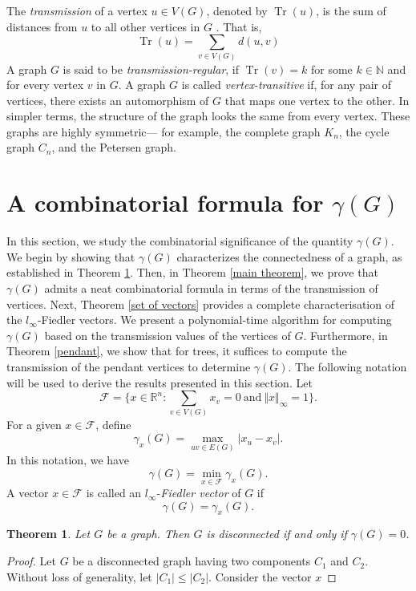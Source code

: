 \documentclass[12pt]{article}
\newtheorem{theorem}{Theorem}[section]
\DeclareMathOperator{\tr}{Tr}
\begin{document}
{{			The \textit{transmission} of a vertex $u \in V(G)$, denoted by  $\tr(u)$, is the sum of distances from $u$ to all other vertices in $G$ \cite{Distance-spectra}. That is, 
			$$
			\tr(u)=\sum_{ v\in V(G)}d(u,v)
			$$
			A graph $G$ is said to be \textit{transmission-regular}, if $\tr(v)=k$  for some $k\in \mathbb{N}$ and for every vertex $v$ in $G$.
			A graph $G$ is called \textit{vertex-transitive} \cite{nica-book-2018} if, for any pair of vertices, there exists an automorphism of $G$ that maps one vertex to the other. In simpler terms, the structure of the graph looks the same from every vertex. These graphs are highly symmetric--- for example, the complete graph $K_n$, the cycle graph $C_n$, and the Petersen graph. 
			
			\section{A combinatorial formula for $\gamma (G)$}\label{main-results}
			In this section, we study the combinatorial significance of the quantity $\gamma(G)$. We begin by showing that $\gamma(G)$ characterizes the connectedness of a graph, as established in Theorem \ref{gamma-connected}.
			Then, in Theorem \ref{main theorem}, we prove that $\gamma(G)$ admits a neat combinatorial formula in terms of the transmission of vertices. Next, Theorem \ref{set of vectors} provides a complete characterisation of the $l_\infty$-Fiedler vectors.  We present a polynomial-time algorithm for computing $\gamma(G)$ based on the transmission values of the vertices of $G$. Furthermore, in Theorem \ref{pendant}, we show that for trees, it suffices to compute the transmission of the pendant vertices to determine $\gamma(G)$.
			The following notation will be used to derive the results presented in this section. Let $$\mathcal{F}=\biggl\{x \in \mathbb{R}^n:\sum_{v \in V(G)} x_v =0 ~\mbox{and} ~\Vert x \Vert_{\infty}=1\biggl\}.$$
			For a given $x \in \mathcal{F}$, define $$ \gamma_x(G)=\max_{uv \in E(G)}\vert x_u - x_v \vert .$$ In this notation, we have $$\gamma(G)=\min_{x \in \mathcal{F}}\gamma_x(G). $$ A vector  $x \in \mathcal{F}$ is called an $l_\infty$-\textit{Fiedler vector} of $G$ if $$\gamma(G)=\gamma_x(G).$$
			
			
			\begin{theorem}\label{gamma-connected}
				Let $G$ be a graph. Then $G$ is disconnected if and only if $\gamma(G)=0$.
			\end{theorem}
			\begin{proof}
				Let $G$ be a disconnected graph having two components $C_1$ and $C_2$. Without loss of generality,  let $|C_1|\leq |C_2|$. Consider the vector $x$
				

\end{proof}}}
\end{document}
